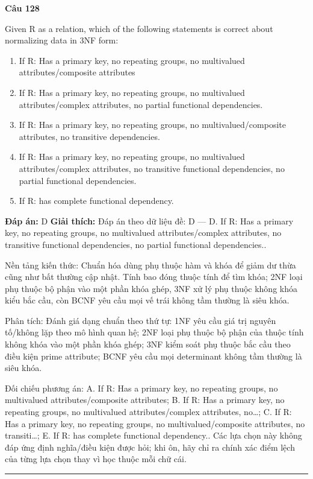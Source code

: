 \documentclass[11pt,a4paper]{article}
\newenvironment{question}[1]{%
  \par\vspace{1em}\noindent\textbf{\large Câu #1}\par\vspace{0.4em}
}{%
  \par\vspace{1em}\hrule\vspace{0.6em}
}
\newenvironment{choices}{%
  \begin{enumerate}[label=\textbf{\Alph*.},leftmargin=2.2em,itemsep=2pt,topsep=3pt]
}{%
  \end{enumerate}
}
\newcommand{\choice}{\item}
\begin{document}
\begin{question}{128}
Given R as a relation, which of the following statements is correct about normalizing data in 3NF form:
\begin{choices}
\choice If R: Has a primary key, no repeating groups, no multivalued attributes/composite attributes
\choice If R: Has a primary key, no repeating groups, no multivalued attributes/complex attributes, no partial functional dependencies.
\choice If R: Has a primary key, no repeating groups, no multivalued/composite attributes, no transitive dependencies.
\choice If R: Has a primary key, no repeating groups, no multivalued attributes/complex attributes, no transitive functional dependencies, no partial functional dependencies.
\choice If R: has complete functional dependency.
\end{choices}
\textbf{Đáp án:} D
\textbf{Giải thích:} Đáp án theo dữ liệu đề: D — D. If R: Has a primary key, no repeating groups, no multivalued attributes/complex attributes, no transitive functional dependencies, no partial functional dependencies..

Nền tảng kiến thức: Chuẩn hóa dùng phụ thuộc hàm và khóa để giảm dư thừa cũng như bất thường cập nhật. Tính bao đóng thuộc tính để tìm khóa; 2NF loại phụ thuộc bộ phận vào một phần khóa ghép, 3NF xử lý phụ thuộc không khóa kiểu bắc cầu, còn BCNF yêu cầu mọi vế trái không tầm thường là siêu khóa.

Phân tích: Đánh giá dạng chuẩn theo thứ tự: 1NF yêu cầu giá trị nguyên tố/không lặp theo mô hình quan hệ; 2NF loại phụ thuộc bộ phận của thuộc tính không khóa vào một phần khóa ghép; 3NF kiểm soát phụ thuộc bắc cầu theo điều kiện prime attribute; BCNF yêu cầu mọi determinant không tầm thường là siêu khóa.

Đối chiếu phương án: A. If R: Has a primary key, no repeating groups, no multivalued attributes/composite attributes; B. If R: Has a primary key, no repeating groups, no multivalued attributes/complex attributes, no…; C. If R: Has a primary key, no repeating groups, no multivalued/composite attributes, no transiti…; E. If R: has complete functional dependency.. Các lựa chọn này không đáp ứng định nghĩa/điều kiện được hỏi; khi ôn, hãy chỉ ra chính xác điểm lệch của từng lựa chọn thay vì học thuộc mỗi chữ cái.
\end{question}
\end{document}
